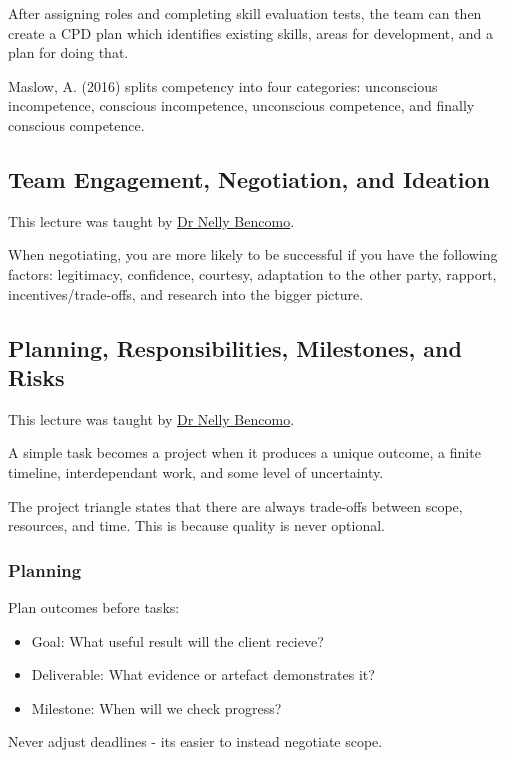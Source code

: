 After assigning roles and completing skill evaluation tests, the team can then create a CPD plan which identifies existing skills, areas for development, and a plan for doing that.

Maslow, A. (2016) splits competency into four categories: unconscious incompetence, conscious incompetence, unconscious competence, and finally conscious competence.

\subsection{Team Engagement, Negotiation, and Ideation}

This lecture was taught by \hyperref[lecturer-nellybencomo]{Dr Nelly Bencomo}.

When negotiating, you are more likely to be successful if you have the following factors: legitimacy, confidence, courtesy, adaptation to the other party, rapport, incentives/trade-offs, and research into the bigger picture.

\subsection{Planning, Responsibilities, Milestones, and Risks}

This lecture was taught by \hyperref[lecturer-nellybencomo]{Dr Nelly Bencomo}.

A simple task becomes a project when it produces a unique outcome, a finite timeline, interdependant work, and some level of uncertainty.

The project triangle states that there are always trade-offs between scope, resources, and time. This is because quality is never optional.

\subsubsection{Planning}

Plan outcomes before tasks:
\begin{itemize}
    \item Goal: What useful result will the client recieve?
    \item Deliverable: What evidence or artefact demonstrates it?
    \item Milestone: When will we check progress?
\end{itemize}
Never adjust deadlines - its easier to instead negotiate scope.

